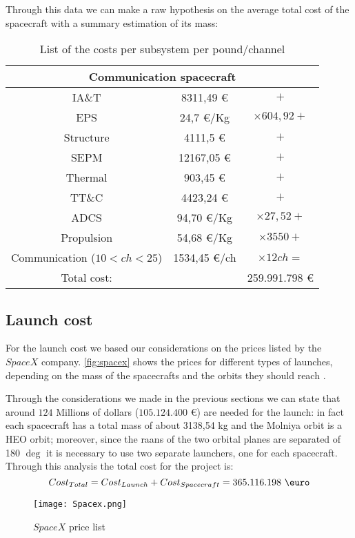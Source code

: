 	Through this data we can make a raw hypothesis on the average total cost of the spacecraft with a summary estimation of its mass:

	\begin{table}
		\centering
		\begin{tabular}{ccc}
		\toprule
		\multicolumn{3}{c}{Communication spacecraft}\\
		\midrule
		IA\&T       & 8311,49 \euro       & $+$\\
		EPS          & 24,7 \euro/Kg        & $\times 604,92 +$\\
		Structure   & 4111,5 \euro     & $+$\\
		SEPM        & 12167,05 \euro     & $+$\\
		Thermal    & 903,45 \euro        & $+$\\
		TT\&C       & 4423,24 \euro      & $+$\\
		ADCS        & 94,70 \euro/Kg     & $\times 27,52 +$\\
		Propulsion & 54,68   \euro/Kg   & $\times 3550 +$\\
		Communication ($10 < ch < 25$) & 1534,45 \euro/ch & $\times 12 ch =$\\
		\bottomrule
		Total cost:& & 259.991.798 \euro\\
		\end{tabular}
		\caption{List of the costs per subsystem per pound/channel}
		\label{tab:cost}
	\end{table}
\subsection{Launch cost}
For the launch cost we based our considerations on the prices listed by the $SpaceX$ company. \autoref{fig:spacex} shows the prices for different types of launches, depending on the mass of the spacecrafts and the orbits they should reach \cite{spacex}.

Through the considerations we made in the previous sections we can state that around $124$ Millions of dollars ($105.124.400$ \euro) are needed for the launch: in fact each spacecraft has a total mass of about 3138,54 kg and the Molniya orbit is a HEO orbit; moreover, since the raans of the two orbital planes are separated of 180 $\deg$ it is necessary to use two separate launchers, one for each spacecraft.\\

Through this analysis the total cost for the project is:
\begin{equation}
Cost_{Total} = Cost_{Launch} + Cost_{Spacecraft} =  365.116.198 \text{ \euro}
\end{equation}

\begin{figure}[htbp]
\centering
\texttt{[image: Spacex.png]}
\caption{$SpaceX$ price list}
\label{fig:spacex}
\end{figure}
